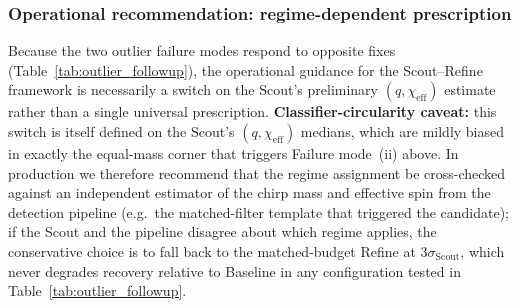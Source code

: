 \documentclass[12pt]{article}
\begin{document}
\subsubsection{Operational recommendation: regime-dependent prescription}
\label{sec:population_recommendation}
Because the two outlier failure modes respond to opposite fixes
(Table~\ref{tab:outlier_followup}), the operational guidance for the
Scout--Refine framework is necessarily a switch on the Scout's
preliminary $(q, \chi_{\mathrm{eff}})$ estimate rather than a single
universal prescription. \textbf{Classifier-circularity caveat:} this switch is itself defined on the Scout's $(q, \chi_{\mathrm{eff}})$ medians, which are mildly biased in exactly the equal-mass corner that triggers Failure mode~(ii) above. In production we therefore recommend that the regime assignment be cross-checked against an independent estimator of the chirp mass and effective spin from the detection pipeline (e.g.\ the matched-filter template that triggered the candidate); if the Scout and the pipeline disagree about which regime applies, the conservative choice is to fall back to the matched-budget Refine at $3\sigma_{\mathrm{Scout}}$, which never degrades recovery relative to Baseline in any configuration tested in Table~\ref{tab:outlier_followup}.
\end{document}
